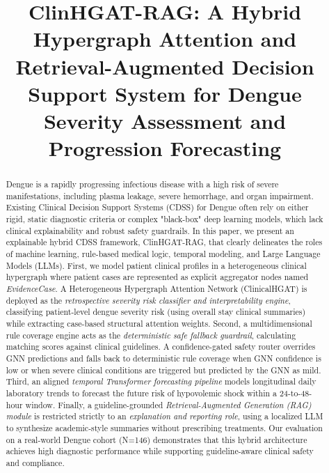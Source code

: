 \documentclass[conference]{IEEEtran}
\begin{document}
\title{ClinHGAT-RAG: A Hybrid Hypergraph Attention and Retrieval-Augmented Decision Support System for Dengue Severity Assessment and Progression Forecasting}

\author{
}

\maketitle

\begin{abstract}
Dengue is a rapidly progressing infectious disease with a high risk of severe manifestations, including plasma leakage, severe hemorrhage, and organ impairment. Existing Clinical Decision Support Systems (CDSS) for Dengue often rely on either rigid, static diagnostic criteria or complex "black-box" deep learning models, which lack clinical explainability and robust safety guardrails. In this paper, we present an explainable hybrid CDSS framework, ClinHGAT-RAG, that clearly delineates the roles of machine learning, rule-based medical logic, temporal modeling, and Large Language Models (LLMs). First, we model patient clinical profiles in a heterogeneous clinical hypergraph where patient cases are represented as explicit aggregator nodes named \textit{EvidenceCase}. A Heterogeneous Hypergraph Attention Network (ClinicalHGAT) is deployed as the \textit{retrospective severity risk classifier and interpretability engine}, classifying patient-level dengue severity risk (using overall stay clinical summaries) while extracting case-based structural attention weights. Second, a multidimensional rule coverage engine acts as the \textit{deterministic safe fallback guardrail}, calculating matching scores against clinical guidelines. A confidence-gated safety router overrides GNN predictions and falls back to deterministic rule coverage when GNN confidence is low or when severe clinical conditions are triggered but predicted by the GNN as mild. Third, an aligned \textit{temporal Transformer forecasting pipeline} models longitudinal daily laboratory trends to forecast the future risk of hypovolemic shock within a 24-to-48-hour window. Finally, a guideline-grounded \textit{Retrieval-Augmented Generation (RAG) module} is restricted strictly to an \textit{explanation and reporting role}, using a localized LLM to synthesize academic-style summaries without prescribing treatments. Our evaluation on a real-world Dengue cohort (N=146) demonstrates that this hybrid architecture achieves high diagnostic performance while supporting guideline-aware clinical safety and compliance.
\end{abstract}
\end{document}
